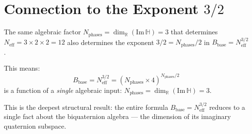 \documentclass[12pt,a4paper]{article}
\theoremstyle{definition}
\theoremstyle{remark}
\begin{document}
\section{Connection to the Exponent $3/2$}
\label{sec:neff12:connection}

The same algebraic factor $N_{\mathrm{phases}} = \dim_\mathbb{R}(\mathrm{Im}\,\mathbb{H}) = 3$
that determines $N_{\mathrm{eff}} = 3 \times 2 \times 2 = 12$ also determines the
exponent $3/2 = N_{\mathrm{phases}}/2$ in $B_{\mathrm{base}} = N_{\mathrm{eff}}^{3/2}$.

This means:
\begin{equation}
  B_{\mathrm{base}} = N_{\mathrm{eff}}^{3/2} = (N_{\mathrm{phases}} \times 4)^{N_{\mathrm{phases}}/2}
  \label{eq:neff12:Bbase_unified}
\end{equation}
is a function of a \emph{single} algebraic input:
$N_{\mathrm{phases}} = \dim_\mathbb{R}(\mathrm{Im}\,\mathbb{H}) = 3$.

This is the deepest structural result: the entire formula
$B_{\mathrm{base}} = N_{\mathrm{eff}}^{3/2}$ reduces to a single fact about the
biquaternion algebra — the dimension of its imaginary quaternion subspace.

\ifdefined\INCLUDEMODE
\else
\end{document}

